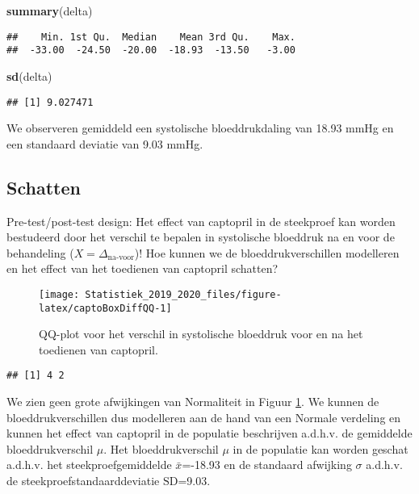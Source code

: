 \documentclass[12pt,dutch,coursenotes]{book}
\newenvironment{Shaded}{\begin{snugshade}}{\end{snugshade}}
\newcommand{\KeywordTok}[1]{\textcolor[rgb]{0.13,0.29,0.53}{\textbf{#1}}}
\newcommand{\NormalTok}[1]{#1}
\theoremstyle{definition}
\theoremstyle{definition}
\theoremstyle{definition}
\theoremstyle{remark}
\begin{document}
\begin{Shaded}
\begin{Highlighting}[]
\KeywordTok{summary}\NormalTok{(delta)}
\end{Highlighting}
\end{Shaded}

\begin{verbatim}
##    Min. 1st Qu.  Median    Mean 3rd Qu.    Max. 
##  -33.00  -24.50  -20.00  -18.93  -13.50   -3.00
\end{verbatim}

\begin{Shaded}
\begin{Highlighting}[]
\KeywordTok{sd}\NormalTok{(delta)}
\end{Highlighting}
\end{Shaded}

\begin{verbatim}
## [1] 9.027471
\end{verbatim}

We observeren gemiddeld een systolische bloeddrukdaling van 18.93 mmHg
en een standaard deviatie van 9.03 mmHg.

\subsection{Schatten}\label{schatten}

Pre-test/post-test design: Het effect van captopril in de steekproef kan
worden bestudeerd door het verschil te bepalen in systolische bloeddruk
na en voor de behandeling (\(X=\Delta_\text{na-voor}\))! Hoe kunnen we
de bloeddrukverschillen modelleren en het effect van het toedienen van
captopril schatten?

\begin{figure}

{\centering \texttt{[image: Statistiek\_2019\_2020\_files/figure-latex/captoBoxDiffQQ-1]} 

}

\caption{QQ-plot voor het verschil in systolische bloeddruk voor en na het toedienen van captopril.}\label{fig:captoBoxDiffQQ}
\end{figure}

\begin{verbatim}
## [1] 4 2
\end{verbatim}

We zien geen grote afwijkingen van Normaliteit in Figuur
\ref{fig:captoBoxDiffQQ}. We kunnen de bloeddrukverschillen dus
modelleren aan de hand van een Normale verdeling en kunnen het effect
van captopril in de populatie beschrijven a.d.h.v. de gemiddelde
bloeddrukverschil \(\mu\). Het bloeddrukverschil \(\mu\) in de populatie
kan worden geschat a.d.h.v. het steekproefgemiddelde \(\bar x\)=-18.93
en de standaard afwijking \(\sigma\) a.d.h.v. de
steekproefstandaarddeviatie \(\text{SD}\)=9.03.
\end{document}
